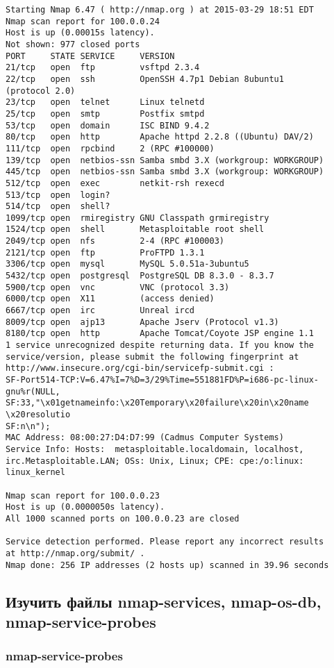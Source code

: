 \documentclass[12pt,a4paper]{article}
\begin{document}
\begin{lstlisting}
Starting Nmap 6.47 ( http://nmap.org ) at 2015-03-29 18:51 EDT
Nmap scan report for 100.0.0.24
Host is up (0.00015s latency).
Not shown: 977 closed ports
PORT     STATE SERVICE     VERSION
21/tcp   open  ftp         vsftpd 2.3.4
22/tcp   open  ssh         OpenSSH 4.7p1 Debian 8ubuntu1
(protocol 2.0)
23/tcp   open  telnet      Linux telnetd
25/tcp   open  smtp        Postfix smtpd
53/tcp   open  domain      ISC BIND 9.4.2
80/tcp   open  http        Apache httpd 2.2.8 ((Ubuntu) DAV/2)
111/tcp  open  rpcbind     2 (RPC #100000)
139/tcp  open  netbios-ssn Samba smbd 3.X (workgroup: WORKGROUP)
445/tcp  open  netbios-ssn Samba smbd 3.X (workgroup: WORKGROUP)
512/tcp  open  exec        netkit-rsh rexecd
513/tcp  open  login?
514/tcp  open  shell?
1099/tcp open  rmiregistry GNU Classpath grmiregistry
1524/tcp open  shell       Metasploitable root shell
2049/tcp open  nfs         2-4 (RPC #100003)
2121/tcp open  ftp         ProFTPD 1.3.1
3306/tcp open  mysql       MySQL 5.0.51a-3ubuntu5
5432/tcp open  postgresql  PostgreSQL DB 8.3.0 - 8.3.7
5900/tcp open  vnc         VNC (protocol 3.3)
6000/tcp open  X11         (access denied)
6667/tcp open  irc         Unreal ircd
8009/tcp open  ajp13       Apache Jserv (Protocol v1.3)
8180/tcp open  http        Apache Tomcat/Coyote JSP engine 1.1
1 service unrecognized despite returning data. If you know the
service/version, please submit the following fingerprint at
http://www.insecure.org/cgi-bin/servicefp-submit.cgi :
SF-Port514-TCP:V=6.47%I=7%D=3/29%Time=551881FD%P=i686-pc-linux-
gnu%r(NULL,
SF:33,"\x01getnameinfo:\x20Temporary\x20failure\x20in\x20name
\x20resolutio
SF:n\n");
MAC Address: 08:00:27:D4:D7:99 (Cadmus Computer Systems)
Service Info: Hosts:  metasploitable.localdomain, localhost,
irc.Metasploitable.LAN; OSs: Unix, Linux; CPE: cpe:/o:linux:
linux_kernel

Nmap scan report for 100.0.0.23
Host is up (0.0000050s latency).
All 1000 scanned ports on 100.0.0.23 are closed

Service detection performed. Please report any incorrect results
at http://nmap.org/submit/ .
Nmap done: 256 IP addresses (2 hosts up) scanned in 39.96 seconds
\end{lstlisting}
\newpage
\subsection{Изучить файлы nmap-services, nmap-os-db, nmap-service-probes}

\subsubsection{nmap-service-probes}
\end{document}
